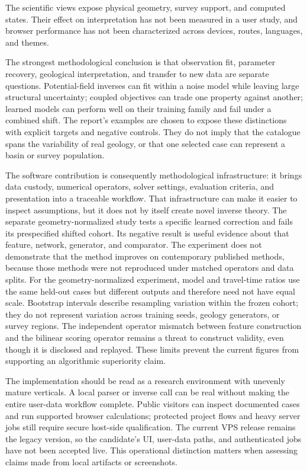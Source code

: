 The scientific views expose physical geometry, survey support, and
computed states. Their effect on interpretation has not been measured in
a user study, and browser performance has not been characterized across
devices, routes, languages, and themes.

The strongest methodological conclusion is that observation fit,
parameter recovery, geological interpretation, and transfer to new data
are separate questions. Potential-field inverses can fit within a
noise model while leaving large structural uncertainty; coupled
objectives can trade one property against another; learned models can
perform well on their training family and fail under a combined shift.
The report's examples are chosen to expose these distinctions with
explicit targets and negative controls. They do not imply that the
catalogue spans the variability of real geology, or that one selected
case can represent a basin or survey population.

The software contribution is consequently methodological infrastructure:
it brings data custody, numerical operators, solver settings, evaluation
criteria, and presentation into a traceable workflow. That infrastructure
can make it easier to inspect assumptions, but it does not by itself
create novel inverse theory. The separate geometry-normalized study
tests a specific learned correction and fails its prespecified shifted
cohort. Its negative result is useful evidence about that feature,
network, generator, and comparator. The experiment does not demonstrate
that the method improves on contemporary published methods, because
those methods were not reproduced under matched operators and data
splits.
For the geometry-normalized experiment, model and travel-time ratios use
the same held-out cases but different outputs and therefore need not
have equal scale. Bootstrap intervals describe resampling variation
within the frozen cohort; they do not represent variation across
training seeds, geology generators, or survey regions. The independent
operator mismatch between feature construction and the bilinear scoring
operator remains a threat to construct validity, even though it is
disclosed and replayed. These limits prevent the current figures from
supporting an algorithmic superiority claim.

The implementation should be read as a research environment with
unevenly mature verticals. A local parser or inverse call can be real
without making the entire user-data workflow complete. Public visitors
can inspect documented cases and run supported browser calculations;
protected project flows and heavy server jobs still require secure
host-side qualification. The current VPS release remains the legacy
version, so the candidate's UI, user-data paths, and authenticated jobs
have not been accepted live. This operational distinction matters when
assessing claims made from local artifacts or screenshots.

